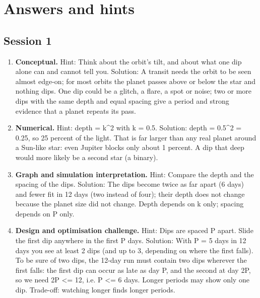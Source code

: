 \documentclass[11pt,a4paper]{article}
\begin{document}
\section{Answers and hints}

\subsection*{Session 1}
\begin{enumerate}[nosep]
\item \textbf{Conceptual.} Hint: Think about the orbit's tilt, and about what one dip alone can and cannot tell you. Solution: A transit needs the orbit to be seen almost edge-on; for most orbits the planet passes above or below the star and nothing dips. One dip could be a glitch, a flare, a spot or noise; two or more dips with the same depth and equal spacing give a period and strong evidence that a planet repeats its pass.
\item \textbf{Numerical.} Hint: depth = k\textasciicircum{}2 with k = 0.5. Solution: depth = 0.5\textasciicircum{}2 = 0.25, so 25 percent of the light. That is far larger than any real planet around a Sun-like star: even Jupiter blocks only about 1 percent. A dip that deep would more likely be a second star (a binary).
\item \textbf{Graph and simulation interpretation.} Hint: Compare the depth and the spacing of the dips. Solution: The dips become twice as far apart (6 days) and fewer fit in 12 days (two instead of four); their depth does not change because the planet size did not change. Depth depends on k only; spacing depends on P only.
\item \textbf{Design and optimisation challenge.} Hint: Dips are spaced P apart. Slide the first dip anywhere in the first P days. Solution: With P = 5 days in 12 days you see at least 2 dips (and up to 3, depending on where the first falls). To be sure of two dips, the 12-day run must contain two dips wherever the first falls: the first dip can occur as late as day P, and the second at day 2P, so we need 2P \textless{}= 12, i.e. P \textless{}= 6 days. Longer periods may show only one dip. Trade-off: watching longer finds longer periods.
\end{enumerate}
\end{document}
